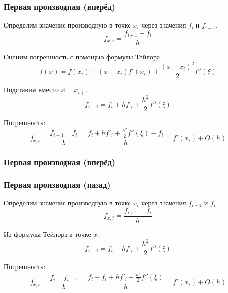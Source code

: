 \documentclass[10pt]{beamer}
\begin{document}
\begin{frame}[fragile]
\frametitle{Первая производная (вперёд)}

Определим значение производную в точке $x_i$ через значения $f_i$ и $f_{i+1}$.
$$f_{x, i} = \frac{f_{i+1} - f_i}{h}$$

Оценим погрешность с помощью формулы Тейлора
$$f(x) = f(x_i) + (x - x_i) f'(x_i) + \frac{(x-x_i)^2}{2} f''(\xi)$$

Подставим вместо $x = x_{i+1}$
$$f_{i+1} = f_i + h f'_i + \frac{h^2}{2} f''(\xi)$$

Погрешность:
$$f_{x, i} = \frac{f_{i+1} - f_i}{h} = 
\frac{f_i + h f'_i + \frac{h^2}{2} f''(\xi) - f_i}{h} =
f'(x_i) + O(h)$$


\end{frame}


\begin{frame}[fragile]
\frametitle{Первая производная (вперёд)}

\begin{center}
\end{center}
\end{frame}

\begin{frame}[fragile]
\frametitle{Первая производная (назад)}


Определим значение производную в точке $x_i$ через значения $f_{i-1}$ и $f_{i}$.
$$f_{x, i} = \frac{f_{i+1} - f_i}{h}$$

Из формулы Тейлора в точке $x_i$:
$$f_{i-1} = f_i - h f'_i + \frac{h^2}{2} f''(\xi)$$

Погрешность:
$$f_{\overline{x}, i} = \frac{f_{i} - f_{i - 1}}{h}  = \frac{f_{i} - f_i + h f'_i - \frac{h^2}{2} f''(\xi)}{h} = f'(x_i) + O(h)$$

\end{frame}
\end{document}
